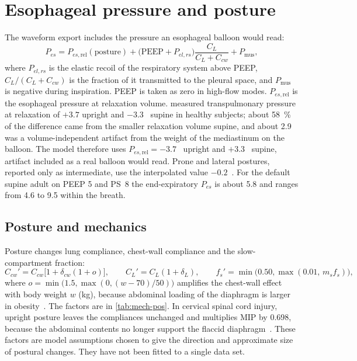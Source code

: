 \section{Esophageal pressure and posture}
\label{sec:mech-pes}
The waveform export includes the pressure an esophageal balloon would read:
\begin{equation}
P_{es}=P_{es,\mathrm{rel}}(\text{posture})+\bigl(\mathrm{PEEP}+P_{el,rs}\bigr)\frac{C_L}{C_L+C_{cw}}+P_{\mathrm{mus}},
\label{eq:mech-pes}
\end{equation}
where $P_{el,rs}$ is the elastic recoil of the respiratory system above PEEP, $C_L/(C_L+C_{cw})$ is the fraction of it transmitted to the pleural space, and $P_{\mathrm{mus}}$ is negative during inspiration. PEEP is taken as zero in high-flow modes. $P_{es,\mathrm{rel}}$ is the esophageal pressure at relaxation volume. \citet{washko2006} measured transpulmonary pressure at relaxation of $+3.7$ upright and $-3.3$~\si{\cmH} supine in healthy subjects; about \SI{58}{\percent} of the difference came from the smaller relaxation volume supine, and about \SI{2.9}{\cmH} was a volume-independent artifact from the weight of the mediastinum on the balloon. The model therefore uses $P_{es,\mathrm{rel}}=-3.7$~\si{\cmH} upright and $+3.3$~\si{\cmH} supine, artifact included as a real balloon would read. Prone and lateral postures, reported only as intermediate, use the interpolated value $-0.2$~\si{\cmH}. For the default supine adult on PEEP 5 and PS~8 the end-expiratory $P_{es}$ is about \SI{5.8}{\cmH} and ranges from 4.6 to \SI{9.5}{\cmH} within the breath.

\subsection{Posture and mechanics}
\label{sec:mech-posture}
Posture changes lung compliance, chest-wall compliance and the slow-compartment fraction:
\begin{equation}
C_{cw}'=C_{cw}\bigl[1+\delta_{cw}(1+o)\bigr],\qquad C_L'=C_L(1+\delta_L),\qquad f_s'=\min\bigl(0.50,\max(0.01,\,m_s f_s)\bigr),
\label{eq:mech-pos}
\end{equation}
where $o=\min\bigl(1.5,\max(0,(w-70)/50)\bigr)$ amplifies the chest-wall effect with body weight $w$ (kg), because abdominal loading of the diaphragm is larger in obesity~\citep{pelosi1998a}. The factors are in \cref{tab:mech-pos}. In cervical spinal cord injury, upright posture leaves the compliances unchanged and multiplies MIP by 0.698, because the abdominal contents no longer support the flaccid diaphragm~\citep{brown2006}. These factors are model assumptions chosen to give the direction and approximate size of postural changes. They have not been fitted to a single data set.


